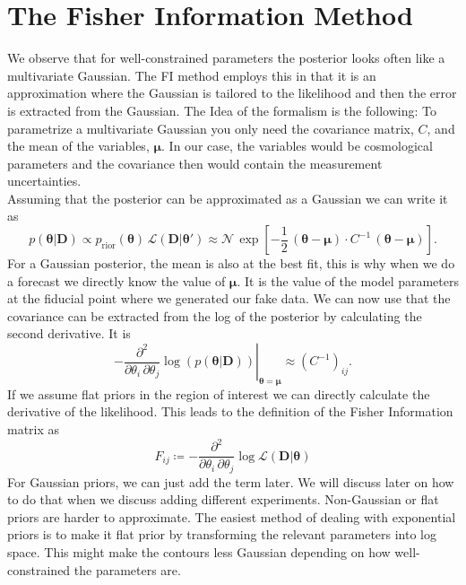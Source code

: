 \documentclass[../main.tex]{subfiles}
\begin{document}
\section{The Fisher Information Method}
We observe that for well-constrained parameters the posterior looks often like a multivariate Gaussian. The FI method employs this in that it is an approximation where the Gaussian is tailored to the likelihood and then the error is extracted from the Gaussian. The Idea of the formalism is the following: To parametrize a multivariate Gaussian you only need the covariance matrix, $C$, and the mean of the variables, $\boldsymbol{\mu}$. In our case, the variables would be cosmological parameters and the covariance then would contain the measurement uncertainties.\\
Assuming that the posterior can be approximated as a Gaussian we can write it as \begin{equation}
    p(\boldsymbol{\theta}|\boldsymbol{D}) \propto p_\mathrm{rior}(\boldsymbol{\theta})\,\mathcal{L}(\boldsymbol{D}|\boldsymbol{\theta}')\approx \mathcal{N}\,\exp\left[-\frac{1}{2}\,\left(\boldsymbol{\theta}-\boldsymbol{\mu}\right)\cdot C^{-1}\,\left(\boldsymbol{\theta}-\boldsymbol{\mu}\right)\right].
\end{equation}
For a Gaussian posterior, the mean is also at the best fit, this is why when we do a forecast we directly know the value of $\boldsymbol{\mu}$. It is the value of the model parameters at the fiducial point where we generated our fake data. We can now use that the covariance can be extracted from the log of the posterior by calculating the second derivative. It is \begin{equation}
    \left.-\frac{\partial^2}{\partial \theta_i\,\partial \theta_j}\log(p(\boldsymbol{\theta}|\boldsymbol{D}))\right|_{\boldsymbol{\theta}=\boldsymbol{\mu}}\approx\left(C^{-1}\right)_{ij}. 
\end{equation}
If we assume flat priors in the region of interest we can directly calculate the derivative of the likelihood. This leads to the definition of the Fisher Information matrix as \begin{equation}
    F_{ij}\coloneqq -\frac{\partial^2}{\partial \theta_i\,\partial \theta_j}\log\mathcal{L}(\boldsymbol{D}|\boldsymbol{\theta})
\end{equation}
For Gaussian priors, we can just add the term later. We will discuss later on how to do that when we discuss adding different experiments. Non-Gaussian or flat priors are harder to approximate. The easiest method of dealing with exponential priors is to make it flat prior by transforming the relevant parameters into log space. This might make the contours less Gaussian depending on how well-constrained the parameters are.\\
\end{document}
